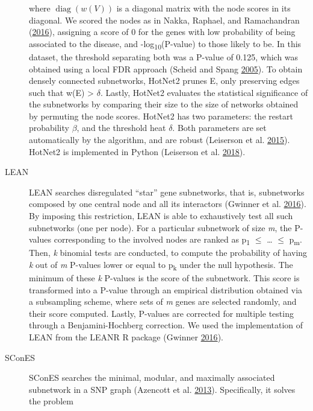 \documentclass[
  11pt,
]{env/yjiao}
\begin{document}
\begin{description}
where \(\operatorname{diag}(w(V))\) is a diagonal matrix with the node
scores in its diagonal. We scored the nodes as in
Nakka, Raphael, and Ramachandran (\protect\hyperlink{ref-nakka_gene_2016}{2016}), assigning a score of 0 for the genes with low
probability of being associated to the disease, and
-log\textsubscript{10}(P-value) to those likely to be. In this dataset, the
threshold separating both was a P-value of 0.125, which was obtained
using a local FDR approach (Scheid and Spang \protect\hyperlink{ref-scheid_twilight_2005}{2005}). To obtain
densely connected subnetworks, HotNet2 prunes E, only preserving
edges such that w(E) \textgreater{} \(\delta\). Lastly, HotNet2 evaluates the
statistical significance of the subnetworks by comparing their size
to the size of networks obtained by permuting the node scores.
HotNet2 has two parameters: the restart probability \(\beta\), and the
threshold heat \(\delta\). Both parameters are set automatically by
the algorithm, and are robust (Leiserson et al. \protect\hyperlink{ref-leiserson_pan-cancer_2015}{2015}). HotNet2
is implemented in Python (Leiserson et al. \protect\hyperlink{ref-hotnet2}{2018}).
\item[LEAN]
LEAN searches disregulated ``star'' gene subnetworks, that is,
subnetworks composed by one central node and all its interactors
(Gwinner et al. \protect\hyperlink{ref-gwinner_network-based_2016}{2016}). By imposing this restriction, LEAN is
able to exhaustively test all such subnetworks (one per node). For a
particular subnetwork of size \emph{m}, the P-values corresponding to the
involved nodes are ranked as p\textsubscript{1} \(\le\) \ldots{} \(\le\) p\textsubscript{m}. Then, \emph{k}
binomial tests are conducted, to compute the probability of having
\emph{k} out of \emph{m} P-values lower or equal to p\textsubscript{k} under the null
hypothesis. The minimum of these \emph{k} P-values is the score of the
subnetwork. This score is transformed into a P-value through an
empirical distribution obtained via a subsampling scheme, where sets
of \emph{m} genes are selected randomly, and their score computed.
Lastly, P-values are corrected for multiple testing through a
Benjamini-Hochberg correction. We used the implementation of LEAN
from the LEANR R package (Gwinner \protect\hyperlink{ref-leanr}{2016}).
\item[SConES]
SConES searches the minimal, modular, and maximally associated
subnetwork in a SNP graph (Azencott et al. \protect\hyperlink{ref-azencott_efficient_2013}{2013}). Specifically,
it solves the problem


\end{description}
\end{document}
